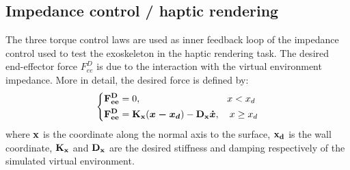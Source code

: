 %


\subsection{Impedance control / haptic rendering} \label{sub:impedanceCJICF}

The three torque control laws are used as inner feedback loop of the impedance control used to test the exoskeleton in the haptic rendering task. The desired end-effector force $F_{ee}^D$ is due to the interaction with the virtual environment impedance. More in detail, the desired force is defined by:
%
\begin{equation}
\label{eq:desiredVE}
\left \{
\begin{aligned}
& \vect{ F_{ee}^D} = 0, \ \ \ \quad \quad \quad \quad \quad \quad \quad \quad  x < x_d \\
& \vect{F_{ee}^D} = \vectm{K_x} (\vects{x - x_d}) - \vectm{D_x}\vects{\dot{x}}, \quad  x \geq x_d  \\
\end{aligned}
\right .
\end{equation}
%
%
%
where $\mathbf{x}$ is the coordinate along the normal axis to the surface, $\mathbf{x_d}$   is the wall coordinate, $\mathbf{K_x}$ and $\mathbf{D_x}$ are the desired stiffness and damping respectively of the simulated virtual environment.


